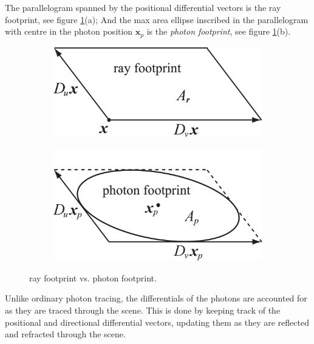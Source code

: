 The parallelogram spanned by the positional differential vectors is the ray footprint, see figure \ref{f:ray-and-photon-footprint}(a); And the max area ellipse inscribed in the parallelogram with centre in the photon position $\mathbf{x}_p$ is the \textit{photon footprint}, see figure \ref{f:ray-and-photon-footprint}(b).

\begin{figure}
\begin{center}
	\begin{subfigure}[b]{.48\textwidth}
		\includegraphics[width=1.\textwidth]{graphics/pm/pm-13-4}
		\caption{}
	\end{subfigure}
	\begin{subfigure}[b]{.48\textwidth}
		\includegraphics[width=1.\textwidth]{graphics/pm/pm-13-5}
		\caption{}
	\end{subfigure}
\end{center}
\caption{ray footprint vs. photon footprint.}
\label{f:ray-and-photon-footprint}
\end{figure}

Unlike ordinary photon tracing, the differentials of the photons are accounted for as they are traced through the scene. This is done by keeping track of the positional and directional differential vectors, updating them as they are reflected and refracted through the scene.

